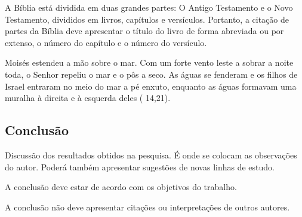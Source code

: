 A Bíblia está dividida em duas grandes partes: O Antigo Testamento e o Novo Testamento, divididos em livros, capítulos e versículos. 
Portanto, a citação de partes da Bíblia deve apresentar o título do livro de forma abreviada ou por extenso, o número do capítulo e o número do versículo.


\begin{citacaodireta}
Moisés estendeu a mão sobre o mar. Com um forte \hspace{-0.1cm} vento \hspace{0.1cm} leste a \hspace{0.1cm}sobrar a
noite toda, o Senhor repeliu o mar e o pôs a seco. As águas se fenderam e
os filhos de Israel entraram no meio do mar a pé enxuto, enquanto as águas
formavam uma muralha à direita e à esquerda deles (\citeauthor{biblia} 14,21).
\end{citacaodireta}

\subsection{\esp Conclusão}

Discussão dos resultados obtidos na pesquisa. É onde se colocam as observações do autor. 
Poderá também apresentar sugestões de novas linhas de estudo.

A conclusão deve estar de acordo com os objetivos do trabalho.

A conclusão não deve apresentar citações ou interpretações de outros autores.

% 
